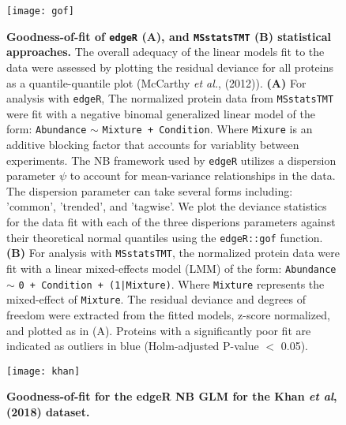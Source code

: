 

\begin{figure}[h] %
	\begin{fullwidth}
		\begin{center}
		\texttt{[image: gof]}
		\caption{\textbf{Goodness-of-fit of \texttt{edgeR} (A), and 
		\texttt{MSstatsTMT} (B) statistical approaches.} The overall
		adequacy of the linear models fit to the data were assessed 
		by plotting the residual deviance for all proteins as a 
		quantile-quantile plot (McCarthy \textit{et al.}, (2012)). 
		\textbf{(A)} For analysis with \texttt{edgeR}, The normalized
		protein data from \texttt{MSstatsTMT} were fit with a negative
		binomal generalized linear model of the form: 
		\texttt{Abundance} $\sim$ \texttt{Mixture + Condition}.
		Where \texttt{Mixure} is an additive blocking factor that 
		accounts for variablity between experiments. 
		The NB framework used by \texttt{edgeR} utilizes a dispersion 
			parameter $\psi$
		to account for mean-variance relationships in the data.
		The dispersion parameter can take several forms including:
                'common', 'trended', and 'tagwise'. We plot the deviance
		statistics for the data fit with each of
		the three disperions parameters against their 
		theoretical normal quantiles using the \texttt{edgeR::gof}
		function. \textbf{(B)} For analysis with \texttt{MSstatsTMT},
		the normalized protein data were fit with a linear mixed-effects 
		model (LMM) of the form: 
		\texttt{Abundance} $\sim$ \texttt{0 + Condition + (1|Mixture)}. 
		Where \texttt{Mixture} represents the mixed-effect
		of \texttt{Mixture}. The residual deviance and degrees of 
		freedom were extracted from the fitted models, z-score
		normalized, and plotted as in (A). Proteins with a significantly 
		poor fit are indicated as outliers in blue 
		(Holm-adjusted P-value $<$ 0.05).}
		\label{fig:gof}
	\end{center}
	\end{fullwidth}
\end{figure}

\newpage

\begin{figure}[h] %
  \begin{fullwidth}
  \begin{center}
	  \texttt{[image: khan]}
	  \caption{\textbf{Goodness-of-fit for the edgeR NB GLM for the Khan
	  \textit{et al}, (2018) dataset.} } %
	  \label{fig:khan}
  \end{center}
  \end{fullwidth}
\end{figure}

